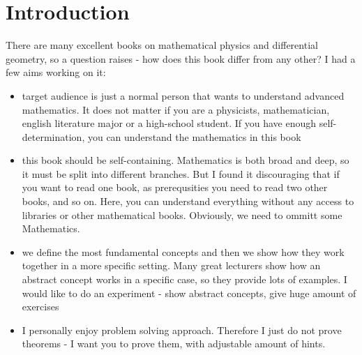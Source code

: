%
%
%

\chapter{Introduction}
\label{intro} %

There are many excellent books on mathematical physics and differential geometry, so a question raises - how does
this book differ from any other? I had a few aims working on it:
\begin{itemize}
	\item target audience is just a normal person that wants to understand advanced mathematics. It does not matter
	if you are a physicists, mathematician, english literature major or a high-school student. If you have
	enough self-determination, you can understand the mathematics in this book
	\item this book should be self-containing. Mathematics is both broad and deep, so it must be split into
	different  branches. But I found it discouraging that if you want to read one book, as prerequsities you need
	to read two other books, and so on. Here, you can understand everything without any access to libraries or
	other mathematical books. Obviously, we need to ommitt some Mathematics.
	\item  we define the most fundamental concepts and then we show how they work together in a more specific
	setting. Many great lecturers show how an abstract concept works in a specific case, so they provide lots of
	examples. I would like to do an experiment - show abstract concepts, give huge amount of exercises
	\item I personally enjoy problem solving approach. Therefore I just do not prove theorems - I want you
	to prove them, with adjustable amount of hints.
	
\end{itemize}

%
